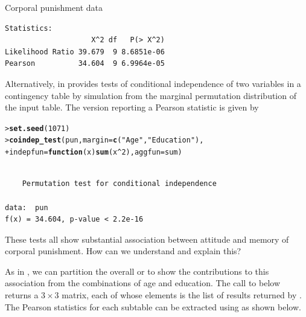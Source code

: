 \documentclass[10pt,krantz2]{krantz}\usepackage[]{graphicx}\usepackage[]{color}
\makeatletter
\newcommand{\hlnum}[1]{\textcolor[rgb]{0.686,0.059,0.569}{#1}}%
\newcommand{\hlstr}[1]{\textcolor[rgb]{0.192,0.494,0.8}{#1}}%
\newcommand{\hlopt}[1]{\textcolor[rgb]{0,0,0}{#1}}%
\newcommand{\hlstd}[1]{\textcolor[rgb]{0.345,0.345,0.345}{#1}}%
\newcommand{\hlkwa}[1]{\textcolor[rgb]{0.161,0.373,0.58}{\textbf{#1}}}%
\newcommand{\hlkwc}[1]{\textcolor[rgb]{0.333,0.667,0.333}{#1}}%
\newcommand{\hlkwd}[1]{\textcolor[rgb]{0.737,0.353,0.396}{\textbf{#1}}}%
\newenvironment{kframe}{%
 \def\at@end@of@kframe{}%
 \ifinner\ifhmode%
  \def\at@end@of@kframe{\end{minipage}}%
  \begin{minipage}{\columnwidth}%
 \fi\fi%
 \def\FrameCommand##1{\hskip\@totalleftmargin \hskip-\fboxsep
 \colorbox{shadecolor}{##1}\hskip-\fboxsep
     \hskip-\linewidth \hskip-\@totalleftmargin \hskip\columnwidth}%
 \MakeFramed {\advance\hsize-\width
   \@totalleftmargin\z@ \linewidth\hsize
   \@setminipage}}%
 {\par\unskip\endMakeFramed%
 \at@end@of@kframe}
\newenvironment{knitrout}{}{} %
\renewenvironment{knitrout}{\small\renewcommand{\baselinestretch}{.85}}{} %
\makeatother
\begin{document}
\begin{Example}[punish]{Corporal punishment data}
\begin{knitrout}
\begin{kframe}
\begin{verbatim}
Statistics:
                    X^2 df   P(> X^2)
Likelihood Ratio 39.679  9 8.6851e-06
Pearson          34.604  9 6.9964e-05
\end{verbatim}
\end{kframe}
\end{knitrout}
Alternatively,  in 
provides tests of conditional independence of two variables in a contingency table by simulation from the marginal permutation
distribution of the input table.  The version reporting a Pearson \chisq
statistic is given by
\begin{knitrout}
\color{fgcolor}\begin{kframe}
\begin{alltt}
\hlstd{> }\hlkwd{set.seed}\hlstd{(}\hlnum{1071}\hlstd{)}
\hlstd{> }\hlkwd{coindep_test}\hlstd{(pun,} \hlkwc{margin} \hlstd{=} \hlkwd{c}\hlstd{(}\hlstr{"Age"}\hlstd{,} \hlstr{"Education"}\hlstd{),}
\hlstd{+ }             \hlkwc{indepfun} \hlstd{=} \hlkwa{function}\hlstd{(}\hlkwc{x}\hlstd{)} \hlkwd{sum}\hlstd{(x} \hlopt{^} \hlnum{2}\hlstd{),} \hlkwc{aggfun} \hlstd{= sum)}
\end{alltt}
\begin{verbatim}

	Permutation test for conditional independence

data:  pun
f(x) = 34.604, p-value < 2.2e-16
\end{verbatim}
\end{kframe}
\end{knitrout}
These tests all show substantial association between attitude and memory of corporal
punishment.  How can we understand and explain this?

As in , we can partition the overall \GSQ or \chisq
to show the contributions to this association
from the combinations of age and education.  The call to  below
returns a $3 \times 3$ matrix, each of whose elements is the list of results
returned by .  The Pearson \chisq statistics for each subtable
can be extracted using  as shown below.


\end{Example}
\end{document}
